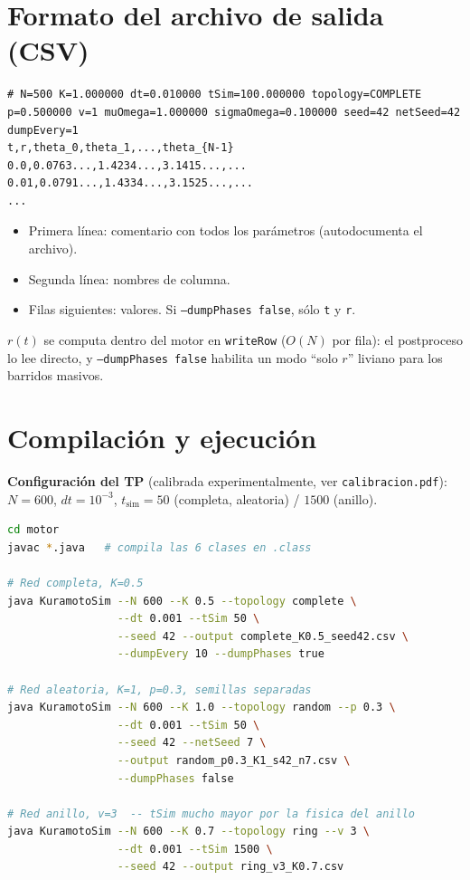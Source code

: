 \documentclass[11pt,a4paper]{article}
\begin{document}
\section{Formato del archivo de salida (CSV)}

\begin{lstlisting}
# N=500 K=1.000000 dt=0.010000 tSim=100.000000 topology=COMPLETE p=0.500000 v=1 muOmega=1.000000 sigmaOmega=0.100000 seed=42 netSeed=42 dumpEvery=1
t,r,theta_0,theta_1,...,theta_{N-1}
0.0,0.0763...,1.4234...,3.1415...,...
0.01,0.0791...,1.4334...,3.1525...,...
...
\end{lstlisting}

\begin{itemize}
\item Primera línea: comentario con todos los parámetros (autodocumenta el archivo).
\item Segunda línea: nombres de columna.
\item Filas siguientes: valores. Si \texttt{--dumpPhases false}, sólo \texttt{t} y \texttt{r}.
\end{itemize}

$r(t)$ se computa dentro del motor en \texttt{writeRow} ($O(N)$ por fila): el postproceso lo lee directo, y \texttt{--dumpPhases false} habilita un modo ``solo $r$'' liviano para los barridos masivos.

\section{Compilación y ejecución}

\textbf{Configuración del TP} (calibrada experimentalmente, ver \texttt{calibracion.pdf}):
$N=600$, $dt=10^{-3}$, $t_{\text{sim}}=50$ (completa, aleatoria) / $1500$ (anillo).

\begin{lstlisting}[language=bash]
cd motor
javac *.java   # compila las 6 clases en .class

# Red completa, K=0.5
java KuramotoSim --N 600 --K 0.5 --topology complete \
                 --dt 0.001 --tSim 50 \
                 --seed 42 --output complete_K0.5_seed42.csv \
                 --dumpEvery 10 --dumpPhases true

# Red aleatoria, K=1, p=0.3, semillas separadas
java KuramotoSim --N 600 --K 1.0 --topology random --p 0.3 \
                 --dt 0.001 --tSim 50 \
                 --seed 42 --netSeed 7 \
                 --output random_p0.3_K1_s42_n7.csv \
                 --dumpPhases false

# Red anillo, v=3  -- tSim mucho mayor por la fisica del anillo
java KuramotoSim --N 600 --K 0.7 --topology ring --v 3 \
                 --dt 0.001 --tSim 1500 \
                 --seed 42 --output ring_v3_K0.7.csv
\end{lstlisting}
\end{document}
